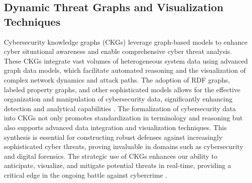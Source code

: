 \subsection{Dynamic Threat Graphs and Visualization Techniques}
Cybersecurity knowledge graphs (CKGs) leverage graph-based models to enhance cyber situational awareness and enable comprehensive cyber threat analysis. These CKGs integrate vast volumes of heterogeneous system data using advanced graph data models, which facilitate automated reasoning and the visualization of complex network dynamics and attack paths. The adoption of RDF graphs, labeled property graphs, and other sophisticated models allows for the effective organization and manipulation of cybersecurity data, significantly enhancing detection and analytical capabilities \cite{18,19,20}.
The formalization of cybersecurity data into CKGs not only promotes standardization in terminology and reasoning but also supports advanced data integration and visualization techniques. This synthesis is essential for constructing robust defenses against increasingly sophisticated cyber threats, proving invaluable in domains such as cybersecurity and digital forensics. The strategic use of CKGs enhances our ability to anticipate, visualize, and mitigate potential threats in real-time, providing a critical edge in the ongoing battle against cybercrime \cite{21,22,23}.




